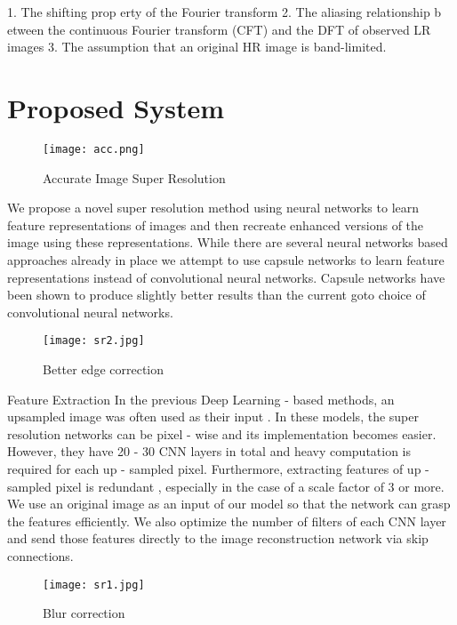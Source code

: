 1. The shifting prop erty of the Fourier transform
2. The aliasing relationship b etween the continuous Fourier transform (CFT) and the DFT of observed LR images
3. The assumption that an original HR image is band-limited.

\section{Proposed System}

\begin{figure}[htb]
    \centering
    \texttt{[image: acc.png]}
    \caption{Accurate Image Super Resolution}
    \label{fig:acc} %
\end{figure}

We propose a novel super resolution method using neural networks to learn feature representations of images and then recreate enhanced versions of the image using these representations. While there are several neural networks based approaches already in place we attempt to use capsule networks to learn feature representations instead of convolutional neural networks. Capsule networks have been shown to produce slightly better results than the current goto choice of convolutional neural networks.

\begin{figure}[htb]
    \centering
    \texttt{[image: sr2.jpg]}
    \caption{Better edge correction}
    \label{fig:sr2} %
\end{figure}

Feature Extraction
In the previous Deep Learning - based methods, an upsampled image was often used as their input . In these models, the super resolution networks can be pixel - wise and its implementation becomes easier. However, they have 20 - 30 CNN layers in total and heavy computation is required for each up - sampled pixel. Furthermore, extracting features of up - sampled pixel is redundant , especially in the case of a scale factor of 3 or more. We use an original image as an input of our model so that the network can grasp the features efficiently. We also optimize the number of filters of each CNN layer and send those features directly to the image reconstruction network via skip connections.

\begin{figure}[htb]
    \centering
    \texttt{[image: sr1.jpg]}
    \caption{Blur correction}
    \label{fig:sr1} %
\end{figure}

